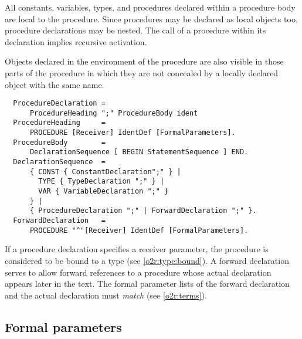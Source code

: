 All constants, variables, types, and procedures declared within a
procedure body are local to the procedure. Since procedures may be
declared as local objects too, procedure declarations may be nested.
The call of a procedure within its declaration implies recursive activation.

Objects declared in the environment of the procedure are also visible
in those parts of the procedure in which they are not concealed by
a locally declared object with the same name.
{\BNFsize
\begin{verbatim}
  ProcedureDeclaration =
      ProcedureHeading ";" ProcedureBody ident
  ProcedureHeading     =
      PROCEDURE [Receiver] IdentDef [FormalParameters].
  ProcedureBody        =
      DeclarationSequence [ BEGIN StatementSequence ] END.
  DeclarationSequence  =
      { CONST { ConstantDeclaration";" } |
        TYPE { TypeDeclaration ";" } |
        VAR { VariableDeclaration ";" }
      } |
      { ProcedureDeclaration ";" | ForwardDeclaration ";" }.
  ForwardDeclaration   =
      PROCEDURE "^"[Receiver] IdentDef [FormalParameters].
\end{verbatim}}
If a procedure declaration specifies a receiver parameter, the procedure
is considered to be bound to a type (see \ref{o2r:type:bound}).
A forward declaration serves to allow forward references to a procedure
whose actual declaration appears later in the text. The formal parameter
lists of the forward declaration and the actual declaration must {\em match}
(see \ref{o2r:terms}).

\subsection{Formal parameters}\label{o2r:formal:param}

